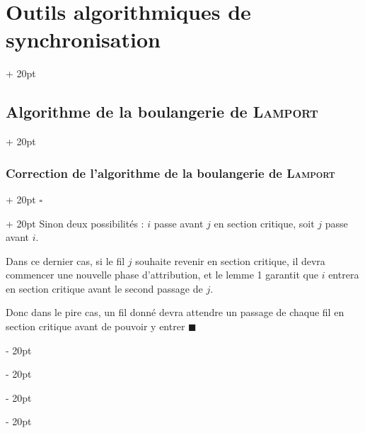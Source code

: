 \documentclass[a4paper, 12pt, twoside]{article}
\newcommand{\ind}[1][20pt]{\advance\leftskip + #1}
\newcommand{\deind}[1][20pt]{\advance\leftskip - #1}
\newenvironment{indt}[2][20pt]{#2 \par \ind[#1]}{\par \deind} %
\newenvironment{proof}[1][{}]{\begin{indt}{$\square$ #1}}{$\blacksquare$ \end{indt}}
\begin{document}
\begin{indt}{\section{Outils algorithmiques de synchronisation}}
\begin{indt}{\subsection{Algorithme de la boulangerie de \textsc{Lamport}}}
\begin{indt}{\subsubsection{Correction de l'algorithme de la boulangerie de \textsc{Lamport}}}
\begin{proof}
                    Sinon deux possibilités : $i$ passe avant $j$ en section critique, soit $j$ passe avant $i$.

                    Dans ce dernier cas, si le fil $j$ souhaite revenir en section critique, il devra commencer une nouvelle phase d'attribution, et le lemme 1 garantit que $i$ entrera en section critique avant le second passage de $j$.

                    Donc dans le pire cas, un fil donné devra attendre un passage de chaque fil en section critique avant de pouvoir y entrer
                \end{proof}
            \end{indt}
        \end{indt}
    \end{indt}
    
    
    
\end{document}
